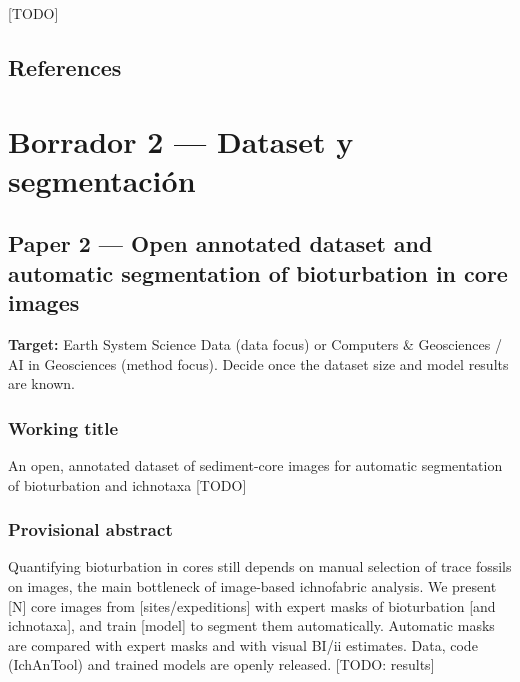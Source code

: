 \documentclass[
  10pt,
]{article}
\begin{document}
{[}TODO{]}

\hypertarget{references}{%
\subsection{References}\label{references}}

\newpage

\hypertarget{borrador-2-dataset-y-segmentaciuxf3n}{%
\section{Borrador 2 --- Dataset y
segmentación}\label{borrador-2-dataset-y-segmentaciuxf3n}}

\hypertarget{paper-2-open-annotated-dataset-and-automatic-segmentation-of-bioturbation-in-core-images}{%
\subsection{Paper 2 --- Open annotated dataset and automatic
segmentation of bioturbation in core
images}\label{paper-2-open-annotated-dataset-and-automatic-segmentation-of-bioturbation-in-core-images}}

\textbf{Target:} Earth System Science Data (data focus) or Computers \&
Geosciences / AI in Geosciences (method focus). Decide once the dataset
size and model results are known.

\hypertarget{working-title}{%
\subsubsection{Working title}\label{working-title}}

An open, annotated dataset of sediment-core images for automatic
segmentation of bioturbation and ichnotaxa {[}TODO{]}

\hypertarget{provisional-abstract}{%
\subsubsection{Provisional abstract}\label{provisional-abstract}}

Quantifying bioturbation in cores still depends on manual selection of
trace fossils on images, the main bottleneck of image-based ichnofabric
analysis. We present {[}N{]} core images from {[}sites/expeditions{]}
with expert masks of bioturbation {[}and ichnotaxa{]}, and train
{[}model{]} to segment them automatically. Automatic masks are compared
with expert masks and with visual BI/ii estimates. Data, code
(IchAnTool) and trained models are openly released. {[}TODO: results{]}
\end{document}
